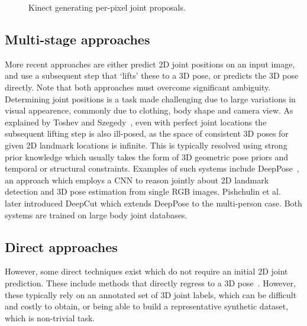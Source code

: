     \begin{figure}[H] %
        \caption{Kinect generating per-pixel joint proposals.}
        \label{fig:kinect_skeleton}
    \end{figure}

    \subsection{Multi-stage approaches}
    More recent approaches are either predict 2D joint positions on an input image, and use a subsequent step that `lifts' these to a 3D pose, or predicts the 3D pose directly. Note that both approaches must overcome significant ambiguity. Determining joint positions is a task made challenging due to large variations in visual appearence, commonly due to clothing, body shape and camera view. As explained by Toshev and Szegedy~\cite{toshev2014deeppose}, even with perfect joint locations the subsequent lifting step is also ill-posed, as the space of consistent 3D poses for given 2D landmark locations is infinite. This is typically resolved using strong prior knowledge which usually takes the form of 3D geometric pose priors and temporal or structural constraints. Examples of such systems include DeepPose~\cite{toshev2014deeppose}, an approach which employs a CNN to reason jointly about 2D landmark detection and 3D pose estimation from single RGB images. Pishchulin et al.~\cite{pishchulin2016deepcut} later introduced DeepCut which extends DeepPose to the multi-person case. Both systems are trained on large body joint databases. 

    \subsection{Direct approaches}
    However, some direct techniques exist which do not require an initial 2D joint prediction. These include methods that directly regress to a 3D pose~\cite{tekin2016direct}. However, these typically rely on an annotated set of 3D joint labels, which can be difficult and costly to obtain, or being able to build a representative synthetic dataset, which is non-trivial task.

